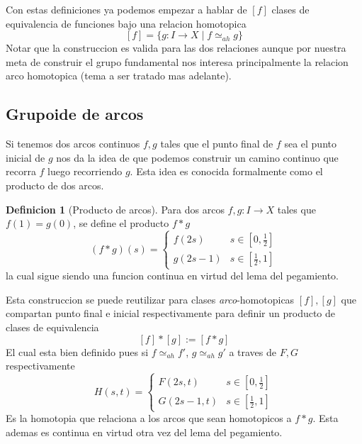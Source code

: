 \documentclass[letterpaper]{article}
\theoremstyle{definition}
\newtheorem{definicion}{Definicion}
\theoremstyle{plain}
\theoremstyle{plain}
\theoremstyle{remark}
\begin{document}
Con estas definiciones ya podemos empezar a hablar de \([f]\) clases
de equivalencia de funciones bajo una relacion homotopica
\[ [f] = \{ g : I \to X \mid f \simeq_{ah} g \} \]
Notar que la construccion es valida para las dos relaciones aunque por
nuestra meta de construir el grupo fundamental nos interesa
principalmente la relacion arco homotopica (tema a ser tratado mas adelante).

\subsection{Grupoide de arcos}
Si tenemos dos arcos continuos \(f,g\) tales que el punto final de \(f\)
sea el punto inicial de \(g\) nos da la idea de que podemos construir un
camino continuo que recorra \(f\) luego recorriendo \(g\). Esta idea es
conocida formalmente como el producto de dos arcos.

\begin{definicion}[Producto de arcos]
Para dos arcos \(f,g : I \to X\) tales que
\(f(1) = g(0)\), se define el producto \(f * g \)
\[ (f*g) (s) = \begin{cases}
    f(2s) & s \in [0,\frac{1}{2}] \\
    g(2s - 1) & s \in [\frac{1}{2} , 1]
  \end{cases}
\]
la cual sigue siendo una funcion continua en virtud del lema del
pegamiento.
\end{definicion}

Esta construccion se puede reutilizar para clases
\emph{arco}-homotopicas \([f],[g]\) que compartan punto final e inicial
respectivamente para definir un producto de clases de equivalencia
\[ [f] * [g] := [f * g]\]
El cual esta bien definido pues si \(f \simeq_{ah} f'\), \(g \simeq_{ah}
g'\) a traves de \(F, G\) respectivamente
\[H(s,t) = \begin{cases}
    F(2s,t) & s \in [0, \frac{1}{2}] \\
    G(2s - 1, t) & s \in [\frac{1}{2} , 1]
  \end{cases}
\]
Es la homotopia que relaciona a los arcos que sean homotopicos a
\(f*g\). Esta ademas es continua en virtud otra vez del lema del pegamiento.
\end{document}
